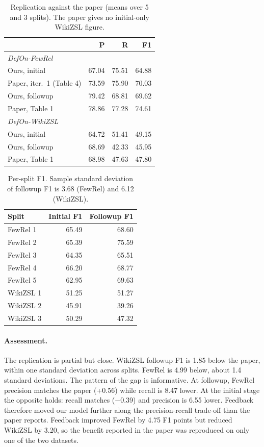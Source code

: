 \begin{table}[t]
\centering\small
\begin{tabular}{lrrr}
\toprule
 & P & R & F1 \\
\midrule
\multicolumn{4}{l}{\emph{DefOn-FewRel}} \\
Ours, initial & 67.04 & 75.51 & 64.88 \\
Paper, iter.\ 1 (Table 4) & 73.59 & 75.90 & 70.03 \\
Ours, followup & 79.42 & 68.81 & 69.62 \\
Paper, Table 1 & 78.86 & 77.28 & 74.61 \\
\midrule
\multicolumn{4}{l}{\emph{DefOn-WikiZSL}} \\
Ours, initial & 64.72 & 51.41 & 49.15 \\
Ours, followup & 68.69 & 42.33 & 45.95 \\
Paper, Table 1 & 68.98 & 47.63 & 47.80 \\
\bottomrule
\end{tabular}
\caption{Replication against the paper (means over 5 and 3 splits). The paper gives no initial-only WikiZSL figure.}
\label{tab:replication}
\end{table}

\begin{table}[t]
\centering\small
\begin{tabular}{lrr}
\toprule
Split & Initial F1 & Followup F1 \\
\midrule
FewRel 1 & 65.49 & 68.60 \\
FewRel 2 & 65.39 & 75.59 \\
FewRel 3 & 64.35 & 65.51 \\
FewRel 4 & 66.20 & 68.77 \\
FewRel 5 & 62.95 & 69.63 \\
\midrule
WikiZSL 1 & 51.25 & 51.27 \\
WikiZSL 2 & 45.91 & 39.26 \\
WikiZSL 3 & 50.29 & 47.32 \\
\bottomrule
\end{tabular}
\caption{Per-split F1. Sample standard deviation of followup F1 is 3.68 (FewRel) and 6.12 (WikiZSL).}
\label{tab:splitf1}
\end{table}

\paragraph{Assessment.} The replication is partial but close. WikiZSL followup F1 is 1.85 below the paper, within one standard deviation across splits. FewRel is 4.99 below, about 1.4 standard deviations. The pattern of the gap is informative. At followup, FewRel precision matches the paper (+0.56) while recall is 8.47 lower. At the initial stage the opposite holds: recall matches ($-$0.39) and precision is 6.55 lower. Feedback therefore moved our model further along the precision-recall trade-off than the paper reports. Feedback improved FewRel by 4.75 F1 points but reduced WikiZSL by 3.20, so the benefit reported in the paper was reproduced on only one of the two datasets.


